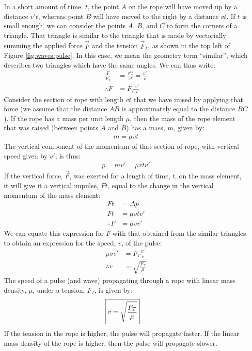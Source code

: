 In a short amount of time, $t$, the point $A$ on the rope will have moved up by a distance $v't$, whereas point $B$ will have moved to the right by a distance $vt$. If $t$ is small enough, we can consider the points $A$, $B$, and $C$ to form the corners of a triangle. That triangle is similar to the triangle that is made by vectorially summing the applied force $\vec F$ and the tension $\vec F_T$, as shown in the top left of Figure \ref{fig:waves:pulse}. In this case, we mean the geometry term ``similar'', which describes two triangles which have the same angles. We can thus write:
\begin{align*}
\frac{F}{F_T}&=\frac{v't}{vt}=\frac{v'}{v}\\
\therefore F&= F_T \frac{v'}{v}
\end{align*}
Consider the section of rope with length $vt$ that we have raised by applying that force (we assume that the distance $AB$ is approximately equal to the distance $BC$). If the rope has a mass per unit length $\mu$, then the mass of the rope element that was raised (between points $A$ and $B$) has a mass, $m$, given by:
\begin{align*}
m = \mu vt
\end{align*}
The vertical component of the momentum of that section of rope, with vertical speed given by $v'$, is thus:
\begin{align*}
p = mv' = \mu vt v'
\end{align*}
If the vertical force, $\vec F$, was exerted for a length of time, $t$, on the mass element, it will give it a vertical impulse, $Ft$, equal to the change in the vertical momentum of the mass element:
\begin{align*}
Ft &= \Delta p \\
Ft &= \mu vt v'\\
\therefore F &= \mu v v'
\end{align*}
We can equate this expression for $F$ with that obtained from the similar triangles to obtain an expression for the speed, $v$, of the pulse:
\begin{align*}
\mu v v' &= F_T \frac{v'}{v}\\
\therefore v&= \sqrt{\frac{F_T}{\mu}}
\end{align*}
The speed of a pulse (and wave) propagating through a rope with linear mass density, $\mu$, under a tension, $F_T$, is given by:
\begin{align}
\Aboxed{v&= \sqrt{\frac{F_T}{\mu}}}
\end{align}
If the tension in the rope is higher, the pulse will propagate faster. If the linear mass density of the rope is higher, then the pulse will propagate slower. 


